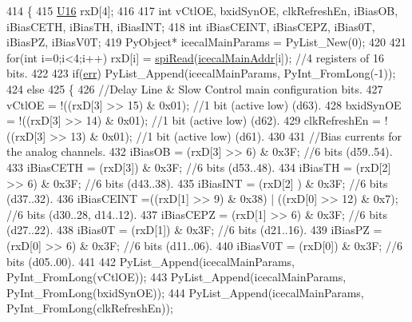 \begin{DoxyCode}
414 \{                            
415     \hyperlink{ICECALv3_8h_adf928e51a60dba0df29d615401cc55a8}{U16} rxD[4];
416 
417     \textcolor{keywordtype}{int} vCtlOE, bxidSynOE, clkRefreshEn, iBiasOB, iBiasCETH, iBiasTH, iBiasINT;
418     \textcolor{keywordtype}{int} iBiasCEINT, iBiasCEPZ, iBias0T, iBiasPZ, iBiasV0T;
419     PyObject* icecalMainParams = PyList\_New(0);
420 
421     \textcolor{keywordflow}{for}(\textcolor{keywordtype}{int} i=0;i<4;i++) rxD[i] = \hyperlink{classICECALv3_aaabb9543482c4141fa89b4b8410164e0}{spiRead}(\hyperlink{ICECALv3_8h_a9c22ae782814495416dc2b803df326c1}{icecalMainAddr}[i]);      \textcolor{comment}{//4 registers of 16
       bits.}
422 
423     \textcolor{keywordflow}{if}(\hyperlink{classICECALv3_ad8989925ee5b3ff322d863ce6aaff0bd}{err}) PyList\_Append(icecalMainParams, PyInt\_FromLong(-1));
424     \textcolor{keywordflow}{else}
425     \{
426         \textcolor{comment}{//Delay Line & Slow Control main configuration bits.}
427         vCtlOE              = !((rxD[3] >> 15) & 0x01);     \textcolor{comment}{//1 bit (active low) (d63).}
428         bxidSynOE           = !((rxD[3] >> 14) & 0x01);     \textcolor{comment}{//1 bit (active low) (d62).}
429         clkRefreshEn    = !((rxD[3] >> 13) & 0x01);     \textcolor{comment}{//1 bit (active low) (d61).}
430 
431         \textcolor{comment}{//Bias currents for the analog channels.}
432         iBiasOB             = (rxD[3] >> 6) & 0x3F;     \textcolor{comment}{//6 bits (d59..54).}
433         iBiasCETH           = (rxD[3])          & 0x3F;     \textcolor{comment}{//6 bits (d53..48).}
434         iBiasTH             = (rxD[2] >> 6) & 0x3F;     \textcolor{comment}{//6 bits (d43..38).}
435         iBiasINT            = (rxD[2] )         & 0x3F;     \textcolor{comment}{//6 bits (d37..32).}
436         iBiasCEINT      =((rxD[1] >> 9) & 0x38) | ((rxD[0] >> 12) & 0x7);       \textcolor{comment}{//6 bits (d30..28,
       d14..12).}
437         iBiasCEPZ           = (rxD[1] >> 6) & 0x3F;     \textcolor{comment}{//6 bits (d27..22).}
438         iBias0T             = (rxD[1])          & 0x3F;     \textcolor{comment}{//6 bits (d21..16).}
439         iBiasPZ             = (rxD[0] >> 6) & 0x3F;     \textcolor{comment}{//6 bits (d11..06).}
440         iBiasV0T            = (rxD[0])          & 0x3F;     \textcolor{comment}{//6 bits (d05..00).}
441 
442         PyList\_Append(icecalMainParams, PyInt\_FromLong(vCtlOE));
443         PyList\_Append(icecalMainParams, PyInt\_FromLong(bxidSynOE));
444         PyList\_Append(icecalMainParams, PyInt\_FromLong(clkRefreshEn));

\end{DoxyCode}
